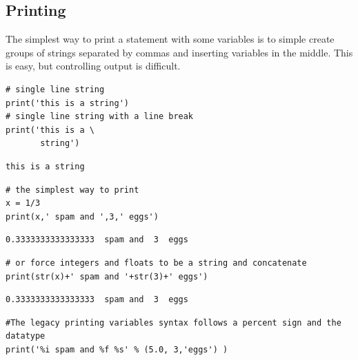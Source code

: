\documentclass[%
oneside,                 %
final,                   %
10pt]{article}
\begin{document}
\subsection{Printing}

The simplest way to print a statement with some variables is to simple create groups of strings separated by commas and inserting variables in the middle. This is easy, but controlling output is difficult.

\begin{Verbatim}[numbers=none,fontsize=\fontsize{9pt}{9pt},baselinestretch=0.95,xleftmargin=2mm]
# single line string
print('this is a string')
# single line string with a line break
print('this is a \
       string')
\end{Verbatim}

\begin{Verbatim}[numbers=none,fontsize=\fontsize{9pt}{9pt},baselinestretch=0.95,xleftmargin=2mm]
this is a string
\end{Verbatim}

\begin{Verbatim}[numbers=none,fontsize=\fontsize{9pt}{9pt},baselinestretch=0.95,xleftmargin=2mm]
# the simplest way to print
x = 1/3
print(x,' spam and ',3,' eggs')
\end{Verbatim}

\begin{Verbatim}[numbers=none,fontsize=\fontsize{9pt}{9pt},baselinestretch=0.95,xleftmargin=2mm]
0.3333333333333333  spam and  3  eggs
\end{Verbatim}

\begin{Verbatim}[numbers=none,fontsize=\fontsize{9pt}{9pt},baselinestretch=0.95,xleftmargin=2mm]
# or force integers and floats to be a string and concatenate
print(str(x)+' spam and '+str(3)+' eggs')
\end{Verbatim}

\begin{Verbatim}[numbers=none,fontsize=\fontsize{9pt}{9pt},baselinestretch=0.95,xleftmargin=2mm]
0.3333333333333333  spam and  3  eggs
\end{Verbatim}

\begin{Verbatim}[numbers=none,fontsize=\fontsize{9pt}{9pt},baselinestretch=0.95,xleftmargin=2mm]
#The legacy printing variables syntax follows a percent sign and the datatype
print('%i spam and %f %s' % (5.0, 3,'eggs') )
\end{Verbatim}
\end{document}
